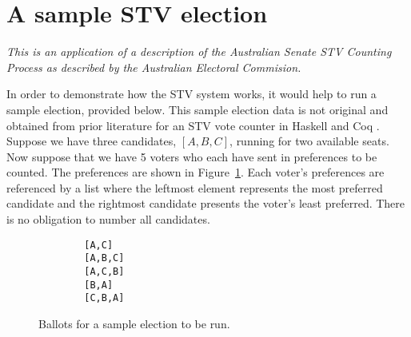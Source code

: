 \begin{algorithm}
\end{algorithm}


\section{A sample STV election}
\textit{This is an application of a description of the Australian Senate STV Counting Process as described by the Australian Electoral Commision.}

In order to demonstrate how the STV system works, it would help to run a sample
election, provided below. This sample election data is not original and obtained
from prior literature for an STV vote counter in Haskell and Coq
\cite{stv_haskell}. Suppose we have three candidates, $[A, B, C]$, running for
two available seats. Now suppose that we have 5 voters who each have sent in
preferences to be counted. The preferences are shown in
Figure~\ref{sample_election}. Each voter's preferences are referenced by a list
where the leftmost element represents the most preferred candidate and the
rightmost candidate presents the voter's least preferred. There is no obligation
to number all candidates. 


\begin{figure}[ht!!!!!!!!]
    \caption{Ballots for a sample election to be run. }
    \label{sample_election}
    \begin{lstlisting}
        [A,C]
        [A,B,C]
        [A,C,B]
        [B,A]
        [C,B,A]
    \end{lstlisting}
\end{figure}

